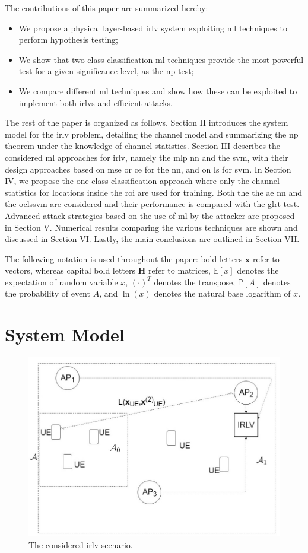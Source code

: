 \documentclass[draftcls,onecolumn,12pt]{IEEEtran}
\begin{document}
The contributions of this paper are summarized hereby:
\begin{itemize}
    \item We propose a  physical layer-based \ac{irlv} system exploiting \ac{ml} techniques to perform hypothesis testing;
    \item We show that two-class classification \ac{ml} techniques provide the most powerful test for a given significance level, as the \ac{np} test;
    \item We compare different \ac{ml} techniques and show how these can be exploited to implement both \acp{irlv} and efficient attacks.
\end{itemize}

The rest of the paper is organized as follows. Section II introduces the system model for the \ac{irlv} problem, detailing the channel model and summarizing the \ac{np} theorem under the knowledge of channel statistics. Section III describes the considered \ac{ml} approaches for \ac{irlv}, namely the \ac{mlp} \ac{nn} and the \ac{svm}, with their design approaches based on \ac{mse} or \ac{ce} for the \ac{nn}, and on  \ac{ls} for \ac{svm}. In Section IV, we propose the one-class classification approach where only the channel statistics for locations inside the \ac{roi} are used for training. Both the the \ac{ae} \ac{nn} and the \ac{oclssvm} are considered and their performance is compared with the \ac{glrt} test. Advanced attack strategies based on the use of \ac{ml} by the attacker are proposed in Section V. Numerical results comparing the various techniques are shown and discussed in Section VI. Lastly, the main conclusions are outlined in Section VII.

The following notation is used throughout the paper: bold letters $\bm{x}$ refer to vectors, whereas capital bold letters $\bm{H}$ refer to matrices, $\mathbb{E}[x]$ denotes the expectation of random variable $x$, $(\cdot)^T$ denotes the transpose, $\mathbb P[A]$ denotes the probability of event $A$, and $\ln(x)$ denotes the natural base logarithm of $x$.

\section{System Model}

\begin{figure}
    \centering
    \includegraphics[width=0.6\columnwidth]{irlv.jpg}
    \caption{The considered \ac{irlv} scenario.}
    \label{fig1}
\end{figure}
\end{document}
